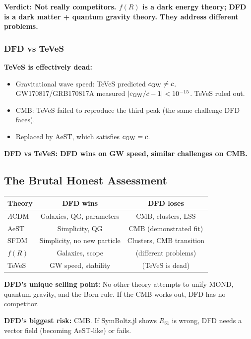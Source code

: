 \documentclass[11pt,a4paper]{article}
\begin{document}
\textbf{Verdict: Not really competitors. $f(R)$ is a dark energy theory; DFD is a dark matter + quantum gravity theory. They address different problems.}

\subsubsection{DFD vs TeVeS}

\textbf{TeVeS is effectively dead:}
\begin{itemize}
\item Gravitational wave speed: TeVeS predicted $c_{\rm GW} \neq c$. GW170817/GRB170817A measured $|c_{\rm GW}/c - 1| < 10^{-15}$. TeVeS ruled out.
\item CMB: TeVeS failed to reproduce the third peak (the same challenge DFD faces).
\item Replaced by AeST, which satisfies $c_{\rm GW} = c$.
\end{itemize}

\textbf{DFD vs TeVeS: DFD wins on GW speed, similar challenges on CMB.}

\subsection{The Brutal Honest Assessment}

\begin{center}
\begin{tabular}{lcc}
\toprule
\textbf{Theory} & \textbf{DFD wins} & \textbf{DFD loses} \\
\midrule
$\Lambda$CDM & Galaxies, QG, parameters & CMB, clusters, LSS \\
AeST & Simplicity, QG & CMB (demonstrated fit) \\
SFDM & Simplicity, no new particle & Clusters, CMB transition \\
$f(R)$ & Galaxies, scope & (different problems) \\
TeVeS & GW speed, stability & (TeVeS is dead) \\
\bottomrule
\end{tabular}
\end{center}

\textbf{DFD's unique selling point:} No other theory attempts to unify MOND, quantum gravity, and the Born rule. If the CMB works out, DFD has no competitor.

\textbf{DFD's biggest risk:} CMB. If SymBoltz.jl shows $R_{31}$ is wrong, DFD needs a vector field (becoming AeST-like) or fails.
\end{document}
